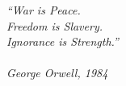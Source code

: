 \renewcommand{\epigraphname}{EPÍGRAFE}
\begin{epigrafe}[EPÍGRAFE]

    \textit{``War is Peace.\\
        Freedom is Slavery.\\
        Ignorance is Strength.''\\
    \\ George Orwell, 1984}

\end{epigrafe}
